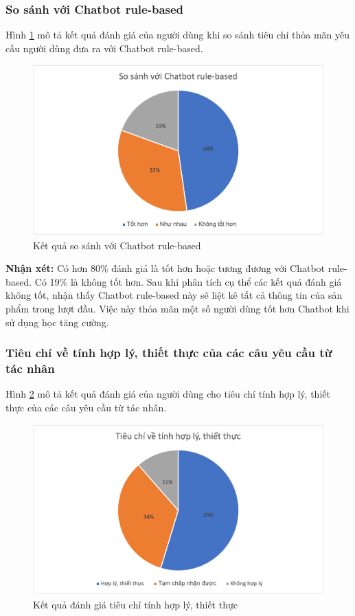 \subsubsection{So sánh với Chatbot rule-based}
Hình \ref{fig:tieuchi12} mô tả kết quả đánh giá của người dùng khi
so sánh tiêu chí thỏa mãn yêu cầu người dùng đưa ra với Chatbot
rule-based.

\begin{figure}[ht!]
    \centering
    \includegraphics[scale=0.91]{thesis/chatbot/ketqua/img/tieuchi1_2.png}
    \caption{Kết quả so sánh với Chatbot rule-based}
    \label{fig:tieuchi12}
\end{figure}

\textbf{Nhận xét:}
Có hơn 80\% đánh giá là tốt hơn hoặc tương đương với Chatbot
rule-based. Có 19\% là không tốt hơn. Sau khi phân tích cụ thể các
kết quả đánh giá không tốt, nhận thấy Chatbot rule-based này sẽ
liệt kê tất cả thông tin của sản phẩm trong lượt đầu. Việc này
thỏa mãn một số người dùng tốt hơn Chatbot khi sử dụng học tăng cường.

\subsubsection{Tiêu chí về tính hợp lý, thiết thực của các câu
yêu cầu từ tác nhân}
Hình \ref{fig:tieuchi2} mô tả kết quả đánh giá của người dùng cho
tiêu chí tính hợp lý, thiết thực của các câu yêu cầu từ tác nhân.

\begin{figure}[ht!]
    \centering
    \includegraphics[scale=0.91]{thesis/chatbot/ketqua/img/tieuchi2.png}
    \caption{Kết quả đánh giá tiêu chí tính hợp lý, thiết thực}
    \label{fig:tieuchi2}
\end{figure}

